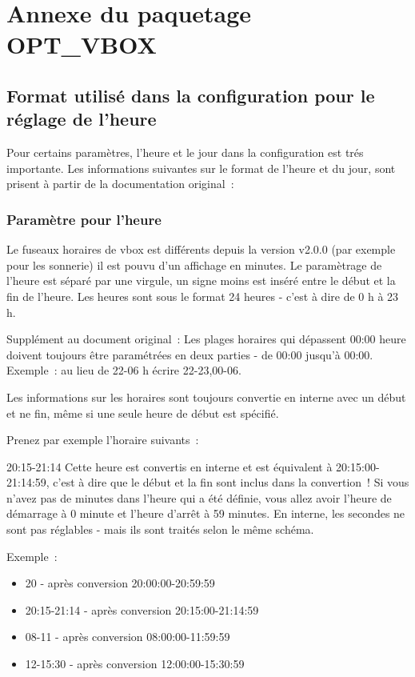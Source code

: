 \section {Annexe du paquetage OPT\_VBOX}

\subsection{Format utilisé dans la configuration pour le réglage de l'heure}

Pour certains paramètres, l'heure et le jour dans la configuration est trés importante.
Les informations suivantes sur le format de l'heure et du jour, sont prisent à partir
de la documentation original~:

\subsubsection{Paramètre pour l'heure}
Le fuseaux horaires de vbox est différents depuis la version v2.0.0 (par exemple
pour les sonnerie) il est pouvu d'un affichage en minutes. Le paramètrage de l'heure
est séparé par une virgule, un signe moins est inséré entre le début et la fin de
l'heure. Les heures sont sous le format 24 heures - c'est à dire de 0 h à 23 h.

Supplément au document original~:
Les plages horaires qui dépassent 00:00 heure doivent toujours être paramétrées en deux
parties - de 00:00 jusqu'à 00:00.
Exemple~: au lieu de 22-06 h écrire 22-23,00-06.

Les informations sur les horaires sont toujours convertie en interne avec un début et 
ne fin, même si une seule heure de début est spécifié.

Prenez par exemple l'horaire suivants~:

20:15-21:14
Cette heure est convertis en interne et est équivalent à 20:15:00-21:14:59, c'est à dire que
le début et la fin sont inclus dans la convertion~!
Si vous n'avez pas de minutes dans l'heure qui a été définie, vous allez avoir l'heure de
démarrage à 0 minute et l'heure d'arrêt à 59 minutes. En interne, les secondes ne sont
pas réglables - mais ils sont traités selon le même schéma.

Exemple~:
\begin{itemize}
    \item 20 - après conversion  20:00:00-20:59:59
    \item 20:15-21:14 - après conversion 20:15:00-21:14:59
    \item 08-11 - après conversion 08:00:00-11:59:59
    \item 12-15:30 - après conversion 12:00:00-15:30:59
\end{itemize}


